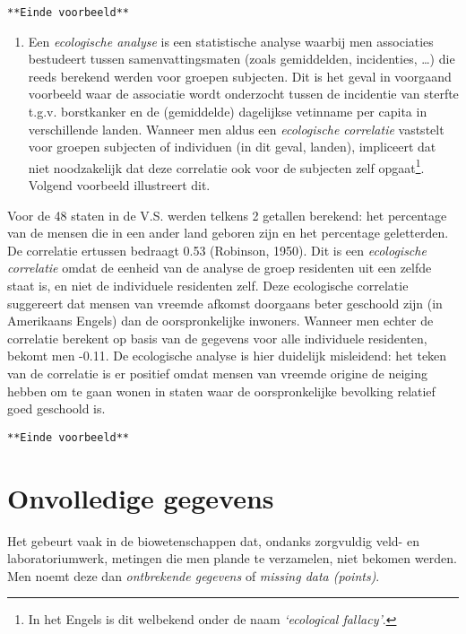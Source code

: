 \documentclass[12pt,dutch,coursenotes]{book}
\providecommand{\tightlist}{%
  \setlength{\itemsep}{0pt}\setlength{\parskip}{0pt}}
\let\rmarkdownfootnote\footnote%
\def\footnote{\protect\rmarkdownfootnote}
\theoremstyle{definition}
\theoremstyle{definition}
\theoremstyle{definition}
\theoremstyle{remark}
\let\BeginKnitrBlock\begin \let\EndKnitrBlock\end
\begin{document}
\texttt{**Einde\ voorbeeld**}

\begin{enumerate}
\def\labelenumi{\arabic{enumi}.}
\setcounter{enumi}{3}
\tightlist
\item
  Een \emph{ecologische analyse} is een statistische analyse waarbij men
  associaties bestudeert tussen samenvattingsmaten (zoals gemiddelden,
  incidenties, \ldots{}) die reeds berekend werden voor groepen
  subjecten. Dit is het geval in voorgaand voorbeeld waar de associatie
  wordt onderzocht tussen de incidentie van sterfte t.g.v. borstkanker
  en de (gemiddelde) dagelijkse vetinname per capita in verschillende
  landen. Wanneer men aldus een \emph{ecologische correlatie} vaststelt
  voor groepen subjecten of individuen (in dit geval, landen),
  impliceert dat niet noodzakelijk dat deze correlatie ook voor de
  subjecten zelf opgaat\footnote{In het Engels is dit welbekend onder de
    naam \emph{`ecological fallacy'}.}. Volgend voorbeeld illustreert
  dit.
\end{enumerate}

\BeginKnitrBlock{example}[Ecological fallacy]
\protect\hypertarget{exm:unnamed-chunk-62}{}{\label{exm:unnamed-chunk-62}
\iffalse (Ecological fallacy) \fi{} }
\EndKnitrBlock{example}

Voor de 48 staten in de V.S. werden telkens 2 getallen berekend: het
percentage van de mensen die in een ander land geboren zijn en het
percentage geletterden. De correlatie ertussen bedraagt 0.53 (Robinson,
1950). Dit is een \emph{ecologische correlatie} omdat de eenheid van de
analyse de groep residenten uit een zelfde staat is, en niet de
individuele residenten zelf. Deze ecologische correlatie suggereert dat
mensen van vreemde afkomst doorgaans beter geschoold zijn (in Amerikaans
Engels) dan de oorspronkelijke inwoners. Wanneer men echter de
correlatie berekent op basis van de gegevens voor alle individuele
residenten, bekomt men -0.11. De ecologische analyse is hier duidelijk
misleidend: het teken van de correlatie is er positief omdat mensen van
vreemde origine de neiging hebben om te gaan wonen in staten waar de
oorspronkelijke bevolking relatief goed geschoold is.

\texttt{**Einde\ voorbeeld**}

\section{Onvolledige gegevens}\label{sec:missing}

Het gebeurt vaak in de biowetenschappen dat, ondanks zorgvuldig veld- en
laboratoriumwerk, metingen die men plande te verzamelen, niet bekomen
werden. Men noemt deze dan \emph{ontbrekende gegevens} of \emph{missing
data (points)}.
\end{document}
